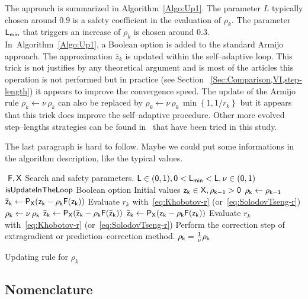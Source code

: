 {The approach is summarized in Algorithm~\ref{Algo:Up1}. The parameter $L$ typically chosen around $0.9$ is a safety coefficient in the evaluation of $\rho_k$. The parameter $\sf L_{min}$ that triggers an increase of $\rho_k$ is chosen around $0.3$.
In~Algorithm~\ref{Algo:Up1}, a Boolean option is added to the standard Armijo approach. The approximation $\bar z_k$ is updated within the self--adaptive loop. This trick is not justifies by any theoretical argument and is most of the articles this operation is not performed but in practice (see Section ~\ref{Sec:Comparison,VI,step-length}) it appears to improve the convergence speed.
 The update of the Armijo rule $\rho_k \leftarrow \nu \,\rho_k$ can also be replaced by  $\rho_k \leftarrow \nu \,\rho_k\, \min\left\{1, 1/r_k\right\}$ but it appears that this trick does improve the self--adaptive procedure. Other more evolved step--lengths strategies can be found in~\citep{Wang_JCAM2010} that have been tried in this study.
\begin{ndroh}
 The last paragraph is hard to follow. Maybe we could put some informations in the algorithm description, like the typical values.
\end{ndroh}
\begin{algorithm}
  \begin{algorithmic}
    {\sf
      \STATE $ $
      \REQUIRE $\sf F,X$
      \REQUIRE Search and safety parameters. $\sf L \in (0,1), 0< L_{min} < L, \nu \in (0,1)$
      \REQUIRE $\sf isUpdateInTheLoop$ Boolean option
      \REQUIRE Initial values $\sf z_k \in X, \rho_{k-1} >0$
      \STATE $\sf \rho_k \leftarrow \rho_{k-1}$
      \STATE $\sf \bar z_{k} \leftarrow P_X(z_k-\rho_k F(z_k))$
      \STATE Evaluate $r_k$ with~\eqref{eq:Khobotov-r} (or~\eqref{eq:SolodovTseng-r})
      \STATE $\sf \rho_k \leftarrow \nu \,\rho_k$ 
      \STATE $\sf \bar z_{k} \leftarrow P_X(\bar z_k-\rho_k F(\bar z_k))$
      \ELSE
      \STATE $\sf \bar z_{k} \leftarrow P_X(z_k-\rho_k F(z_k))$
      \ENDIF
      \STATE Evaluate $r_k$ with~\eqref{eq:Khobotov-r} (or~\eqref{eq:SolodovTseng-r})
      \ENDWHILE
      \STATE Perform the correction step of extragradient or prediction--correction method.
      \STATE $\sf \rho_k = \frac 1 \nu \rho_k$ 
      \ENDIF
    }
  \end{algorithmic}
  \caption{Updating rule for $\rho_k$}  \label{Algo:Up1}
\end{algorithm}

\subsection{Nomenclature}

}
